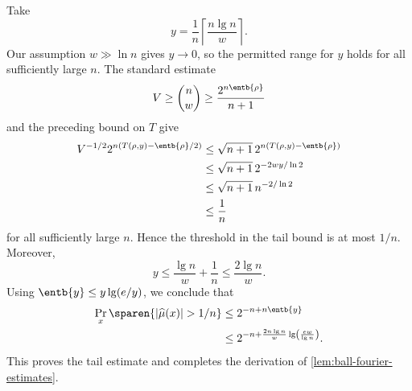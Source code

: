 Take
$$
y=\frac1n\left\lceil\frac{n\lg n}{w}\right\rceil.
$$
Our assumption $w\gg\ln n$ gives $y\longrightarrow0$, so the
permitted range for $y$ holds for all sufficiently large $n$.
The standard estimate
$$
V\ge\binom nw\ge\frac{2^{n\entb{\rho}}}{n+1}
$$
and the preceding bound on $T$ give
$$
\begin{aligned}
V^{-1/2}2^{n(T(\rho,y)-\entb{\rho}/2)}
&\le
\sqrt{n+1}\,2^{n(T(\rho,y)-\entb{\rho})}\\
&\le
\sqrt{n+1}\,2^{-2wy/\ln2}\\
&\le
\sqrt{n+1}\,n^{-2/\ln2}\\
&\le\frac1n
\end{aligned}
$$
for all sufficiently large $n$.  Hence the threshold in the
tail bound is at most $1/n$.  Moreover,
$$
y\le\frac{\lg n}{w}+\frac1n
\le\frac{2\lg n}{w}.
$$
Using $\entb{y}\le y\lg(e/y)$, we conclude that
$$
\begin{aligned}
\Pr_x\sparen{|\widehat\mu(x)|>1/n}
&\le
2^{-n+n\entb{y}}\\
&\le
2^{-n+\frac{2n\lg n}{w}
\lg\left(\frac{ew}{\lg n}\right)}.
\end{aligned}
$$
This proves the tail estimate and completes the derivation of
\autoref{lem:ball-fourier-estimates}.
